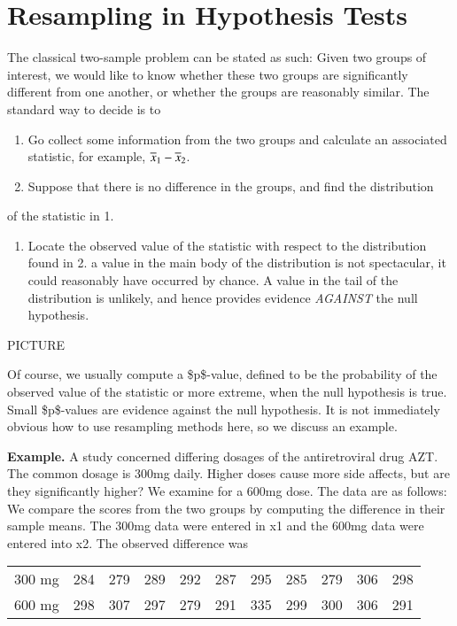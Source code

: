 \documentclass[11pt,english]{scrbook}
\begin{document}
\section{Resampling in Hypothesis Tests}
\label{sec:org469be3e}

The classical two-sample problem can be stated as such: Given two groups of interest, we would like to know whether these two groups are significantly different from one another, or whether the groups are reasonably similar. The standard way to decide is to

\begin{enumerate}
\item Go collect some information from the two groups and calculate an associated statistic, for example, \(\overline{x}_{1}-\overline{x}_{2}\).

\item Suppose that there is no difference in the groups, and find the distribution
\end{enumerate}
of the statistic in 1. 

\begin{enumerate}
\item Locate the observed value of the statistic with respect to the distribution found in 2. a value in the main body of the distribution is not spectacular, it could reasonably have occurred by chance. A value in the tail of the distribution is unlikely, and hence provides evidence \emph{AGAINST} the null hypothesis.
\end{enumerate}


PICTURE

\vspace{1in}


Of course, we usually compute a \$p\$-value, defined to be the probability of the observed value of the statistic or more extreme, when the null hypothesis is true. Small \$p\$-values are evidence against the null hypothesis. It is not immediately obvious how to use resampling methods here, so we discuss an example.

\textbf{Example.} A study concerned differing dosages of the antiretroviral drug AZT. The common dosage is 300mg daily. Higher doses cause more side affects, but are they significantly higher? We examine for a 600mg dose. The data are as follows: We compare the scores from the two groups by computing the difference in their sample means. The 300mg data were entered in x1 and the 600mg data were entered into x2. The observed difference was

\begin{center}
\begin{tabular}{l|cccccccccc}
300 mg  & 284  & 279  & 289  & 292  & 287  & 295  & 285  & 279  & 306  & 298 \tabularnewline
600 mg  & 298  & 307  & 297  & 279  & 291  & 335  & 299  & 300  & 306  & 291 \tabularnewline
\end{tabular}
\par\end{center}
\end{document}

